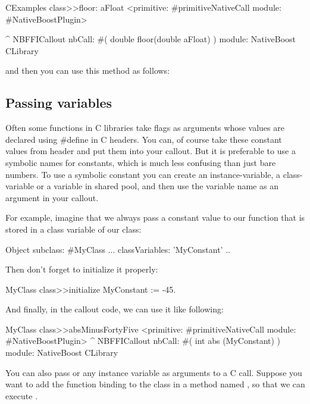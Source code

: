\documentclass[a4paper,10pt,twoside]{book}
\begin{document}
\begin{code}{}
CExamples class>>floor: aFloat
	<primitive: #primitiveNativeCall module: #NativeBoostPlugin>
	
	^ NBFFICallout nbCall: #( double floor(double aFloat) ) module: NativeBoost CLibrary
\end{code}

and then you can use this method as follows: 


\subsection{Passing variables}

Often some functions in C libraries take flags as arguments whose values are declared using \#define in C headers.
You can, of course take these constant values from header and put them into your callout.
But it is preferable to use a symbolic names for constants, which is much less confusing than just bare numbers.
To use a symbolic constant you can create an instance-variable, a class-variable or a variable in shared pool, and then use the variable name as an argument in your callout.

For example, imagine that we always pass a constant value to our function that is stored in a class variable of our class:

\begin{code}{}
Object subclass: #MyClass
	...
	classVariables: 'MyConstant'
..
\end{code}
Then don't forget to initialize it properly:

\begin{code}{}
MyClass class>>initialize
	MyConstant := -45.
\end{code}

And finally, in the callout code, we can use it like following:

\begin{code}{}
MyClass class>>absMinusFortyFive
	<primitive: #primitiveNativeCall module: #NativeBoostPlugin>
	^ NBFFICallout nbCall: #( int abs (MyConstant) ) module: NativeBoost CLibrary
\end{code}

You can also pass  or any instance variable as arguments to a C call. 
Suppose you want to add the  function binding to the class  in a method named  , so that we can execute .
\end{document}
